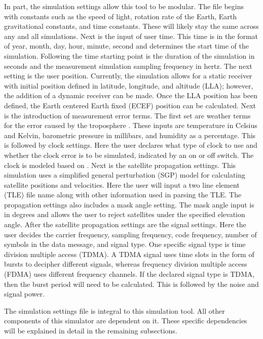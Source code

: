 \documentclass[12pt]{report}
\begin{document}
In part, the simulation settings allow this tool to be modular. The file begins with constants such as the speed of light, rotation rate of the Earth, Earth gravitational constants, and time constants. These will likely stay the same across any and all simulations. Next is the input of user time. This time is in the format of year, month, day, hour, minute, second and determines the start time of the simulation. Following the time starting point is the duration of the simulation in seconds and the measurement simulation sampling frequency in hertz. The next setting is the user position. Currently, the simulation allows for a static receiver with initial position defined in latitude, longitude, and altitude (LLA); however, the addition of a dynamic receiver can be made. Once the LLA position has been defined, the Earth centered Earth fixed (ECEF) position can be calculated. Next is the introduction of measurement error terms. The first set are weather terms for the error caused by the troposphere \cite{misraGlobalPositioningSystem2012}. These inputs are temperature in Celsius and Kelvin, barometric pressure in millibars, and humidity as a percentage. This is followed by clock settings. Here the user declares what type of clock to use and whether the clock error is to be simulated, indicated by an on or off switch. The clock is modeled based on \cite{}. Next is the satellite propagation settings. This simulation uses a simplified general perturbation (SGP) model for calculating satellite positions and velocities. Here the user will input a two line element (TLE) file name along with other information used in parsing the TLE. The propagation settings also includes a mask angle setting. The mask angle input is in degrees and allows the user to reject  satellites under the specified elevation angle. After the satellite propagation settings are the signal settings. Here the user decides the carrier frequency, sampling frequency, code frequency, number of symbols in the data message, and signal type. One specific signal type is time division multiple access (TDMA). A TDMA signal uses time slots in the form of bursts to decipher different signals, whereas frequency division multiple access (FDMA) uses different frequency channels. If the declared signal type is TDMA, then the burst period will need to be calculated. This is followed by the noise and signal power.

The simulation settings file is integral to this simulation tool. All other components of this simulator are dependent on it. These specific dependencies will be explained in detail in the remaining subsections.
\end{document}
